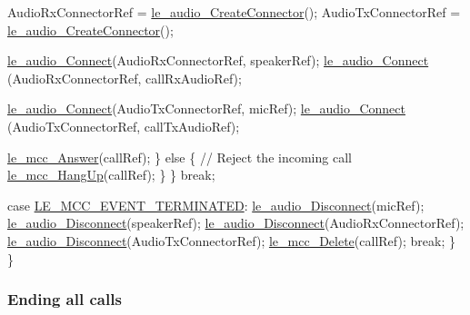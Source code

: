 \begin{DoxyCode}
                    AudioRxConnectorRef = \hyperlink{le__audio__interface_8h_a570aaf85086f00aca592acfbaaa237be}{le\_audio\_CreateConnector}();
                    AudioTxConnectorRef = \hyperlink{le__audio__interface_8h_a570aaf85086f00aca592acfbaaa237be}{le\_audio\_CreateConnector}();

                    \hyperlink{le__audio__interface_8h_a338df65b2fb1ae0140d86880adbcf0de}{le\_audio\_Connect}(AudioRxConnectorRef, speakerRef);
                    \hyperlink{le__audio__interface_8h_a338df65b2fb1ae0140d86880adbcf0de}{le\_audio\_Connect} (AudioRxConnectorRef, callRxAudioRef);

                    \hyperlink{le__audio__interface_8h_a338df65b2fb1ae0140d86880adbcf0de}{le\_audio\_Connect}(AudioTxConnectorRef, micRef);
                    \hyperlink{le__audio__interface_8h_a338df65b2fb1ae0140d86880adbcf0de}{le\_audio\_Connect} (AudioTxConnectorRef, callTxAudioRef);

                    \hyperlink{le__mcc__interface_8h_a598349c6ccfa151dbd1d2f2a9c293ca4}{le\_mcc\_Answer}(callRef);
                \}
                \textcolor{keywordflow}{else}
                \{
                    \textcolor{comment}{// Reject the incoming call}
                    \hyperlink{le__mcc__interface_8h_a7b9567715a3cd30c83a3b6886eeb2044}{le\_mcc\_HangUp}(callRef);
                \}
             \}
         \textcolor{keywordflow}{break};

         \textcolor{keywordflow}{case} \hyperlink{le__mcc__interface_8h_aefc4679ffa76d0e04c578572c22f06cfa38b7c4ab21fa9828be8169372e41ae98}{LE\_MCC\_EVENT\_TERMINATED}:
             \hyperlink{le__audio__interface_8h_a6b88df9301038375701e4c15a4c8aaf0}{le\_audio\_Disconnect}(micRef);
             \hyperlink{le__audio__interface_8h_a6b88df9301038375701e4c15a4c8aaf0}{le\_audio\_Disconnect}(speakerRef);
             \hyperlink{le__audio__interface_8h_a6b88df9301038375701e4c15a4c8aaf0}{le\_audio\_Disconnect}(AudioRxConnectorRef);
             \hyperlink{le__audio__interface_8h_a6b88df9301038375701e4c15a4c8aaf0}{le\_audio\_Disconnect}(AudioTxConnectorRef);
             \hyperlink{le__mcc__interface_8h_a1a016e6443df2d3ee99113649f4f34ae}{le\_mcc\_Delete}(callRef);
         \textcolor{keywordflow}{break};
     \}
 \}
\end{DoxyCode}
\hypertarget{c_mcc_le_mcc_ending_all_call}{}\subsubsection{Ending all calls}\label{c_mcc_le_mcc_ending_all_call}
